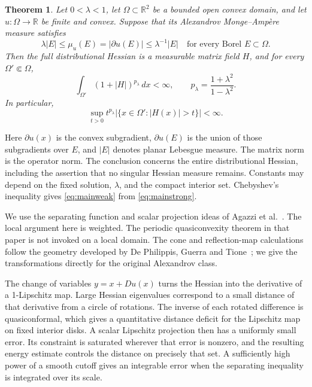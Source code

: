 \documentclass[11pt]{article}
\newtheorem{theorem}{Theorem}[section]
\theoremstyle{remark}
\numberwithin{equation}{section}
\newcommand{\R}{\mathbb R}
\begin{document}
\begin{theorem}\label{thm:main}
Let \(0<\lambda<1\), let \(\Omega\subset\R^2\) be a bounded open convex domain,
and let \(u:\Omega\to\R\) be finite and convex. Suppose that its Alexandrov
Monge--Amp\`ere measure satisfies
\begin{equation}\label{eq:MA}
\lambda|E|\le\mu_u(E)=|\partial u(E)|\le\lambda^{-1}|E|
\quad\text{for every Borel }E\subset\Omega.
\end{equation}
Then the full distributional Hessian is a measurable matrix field \(H\), and
for every \(\Omega'\Subset\Omega\),
\begin{equation}\label{eq:mainstrong}
\int_{\Omega'}(1+|H|)^{p_\lambda}\,dx<\infty,
\qquad p_\lambda=\frac{1+\lambda^2}{1-\lambda^2}.
\end{equation}
In particular,
\begin{equation}\label{eq:mainweak}
\sup_{t>0}t^{p_\lambda}
|\{x\in\Omega':|H(x)|>t\}|<\infty.
\end{equation}
\end{theorem}

Here \(\partial u(x)\) is the convex subgradient, \(\partial u(E)\) is the union
of those subgradients over \(E\), and \(|E|\) denotes planar Lebesgue measure.
The matrix norm is the operator norm. The conclusion concerns the entire
distributional Hessian, including the assertion that no singular Hessian
measure remains. Constants may depend on the fixed solution, \(\lambda\),
and the compact interior set. Chebyshev's inequality gives
\eqref{eq:mainweak} from \eqref{eq:mainstrong}.

We use the separating function and scalar projection ideas of Agazzi
et al.~\cite[Lemmas~3--4]{Agazzi}. The local argument here is weighted.
The periodic quasiconvexity theorem in that paper is not invoked on a local
domain. The cone and reflection-map calculations follow the geometry
developed by De Philippis, Guerra and Tione~\cite[Lemmas~6.3 and~6.9]{DPGT};
we give the transformations directly for the original Alexandrov class.

The change of variables \(y=x+Du(x)\) turns the Hessian into the derivative
of a 1-Lipschitz map. Large Hessian eigenvalues correspond to a small distance
of that derivative from a circle of rotations. The inverse of each rotated
difference is quasiconformal, which gives a quantitative distance deficit
for the Lipschitz map on fixed interior disks. A scalar Lipschitz projection then has a uniformly small
error. Its constraint is saturated wherever that error is nonzero, and the
resulting energy estimate controls the distance on precisely that set.
A sufficiently high power of a smooth cutoff gives an integrable error when
the separating inequality is integrated over its scale.
\end{document}
